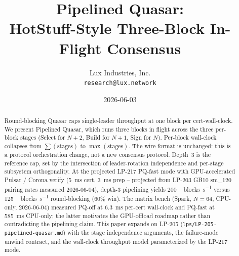 \documentclass[11pt,a4paper]{article}
\title{Pipelined Quasar:\\
       HotStuff-Style Three-Block In-Flight Consensus}
\author{Lux Industries, Inc. \\
        \texttt{research@lux.network}}
\date{2026-06-03}
\begin{document}
\luxcoverpage

\begin{abstract}
Round-blocking Quasar caps single-leader throughput at one block per
cert-wall-clock. We present Pipelined Quasar, which runs three blocks
in flight across the three per-block stages (Select for $N{+}2$, Build
for $N{+}1$, Sign for $N$). Per-block wall-clock collapses from
$\sum(\textrm{stages})$ to $\max(\textrm{stages})$. The wire format is
unchanged: this is a protocol orchestration change, not a new
consensus protocol. Depth~3 is the reference cap, set by the
intersection of leader-rotation independence and per-stage subsystem
orthogonality. At the projected LP-217 PQ-fast mode with GPU-accelerated
Pulsar / Corona verify (\SI{5}{\milli\second} cert, \SI{3}{\milli\second}
prep -- projected from LP-203 GB10 sm\_120 pairing rates measured
2026-06-04), depth-3 pipelining yields \SI{200}{\,blocks\per\second}
versus \SI{125}{\,blocks\per\second} round-blocking ($60\%$ win). The
matrix bench (Spark, $N{=}64$, CPU-only, 2026-06-04) measured PQ-off
at \SI{6.3}{\milli\second} per-cert wall-clock and PQ-fast at
\SI{585}{\milli\second} CPU-only; the latter motivates the GPU-offload
roadmap rather than contradicting the pipelining claim. This paper expands on LP-205
(\texttt{lps/LP-205-pipelined-quasar.md}) with the stage independence
arguments, the failure-mode unwind contract, and the wall-clock
throughput model parameterized by the LP-217 mode.
\end{abstract}

\tableofcontents
\newpage










\end{document}
